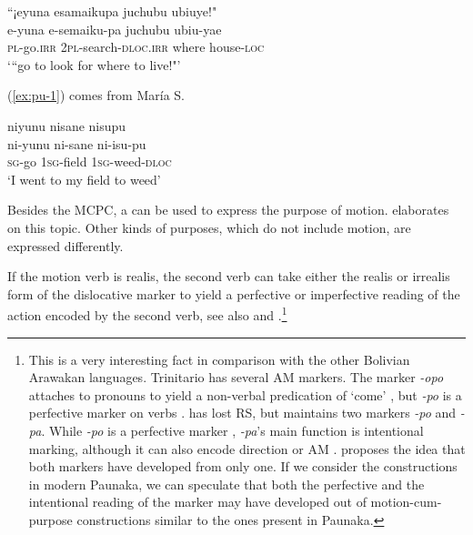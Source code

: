 \ea\label{ex:go-DIR-1}
\begingl 
\glpreamble “¡eyuna esamaikupa juchubu ubiuye!"\\
\gla e-yuna e-semaiku-pa juchubu ubiu-yae\\ 
\textsc{pl}-go.\textsc{irr} 2\textsc{pl}-search-\textsc{dloc.irr} where house-\textsc{loc}\\ 
\glft ‘“go to look for where to live!"’
\trailingcitation{[mxx-p110825l.052]}
\xe

(\ref{ex:pu-1}) comes from María S.

\ea\label{ex:pu-1}
\begingl 
\glpreamble niyunu nisane nisupu\\
\gla ni-yunu ni-sane ni-isu-pu\\ 
\textsc{sg}-go 1\textsc{sg}-field 1\textsc{sg}-weed-\textsc{dloc}\\ 
\glft ‘I went to my field to weed’
\trailingcitation{[rxx-e120511l.033]}
\xe


Besides the MCPC, a  can be used to express the purpose of motion.  elaborates on this topic. Other kinds of purposes, which do not include motion, are expressed differently.

If the motion verb is realis, the second verb can take either the realis or irrealis form of the dislocative marker to yield a perfective or imperfective reading of the action encoded by the second verb, see also  and .\footnote{\label{fn:pu_Baure_Trinitario}This is a very interesting fact in comparison with the other Bolivian Arawakan languages. Trinitario has several AM markers. The marker \textit{-opo} attaches to pronouns to yield a non-verbal predication of ‘come’ \citep[139]{Rose2015}, but \textit{-po} is a perfective marker on verbs \citep[82]{Rose2014}.  has lost RS, but maintains two markers \textit{-po} and \textit{-pa}. While \textit{-po} is a perfective marker \citep[262]{Danielsen2007}, \textit{-pa}’s main function is intentional marking, although it can also encode direction or AM \citep[221--223]{Admiraal2016}. \citet[]{Danielsen2012} proposes the idea that both markers have developed from only one. If we consider the constructions in modern Paunaka, we can speculate that both the perfective and the intentional reading of the  marker may have developed out of motion-cum-purpose constructions similar to the ones present in Paunaka.}


